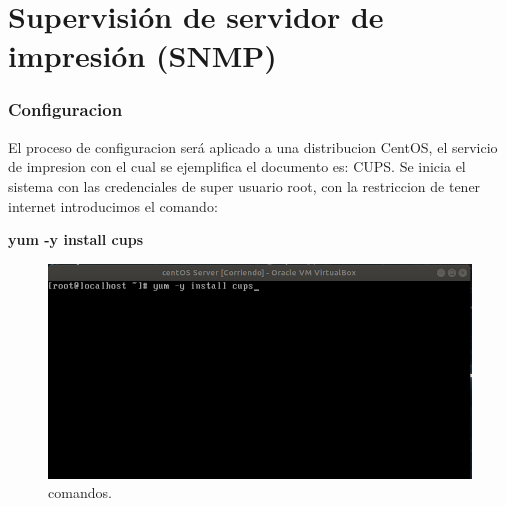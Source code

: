 \section{Supervisión de servidor de impresión (SNMP)}

\subsubsection{Configuracion}

El proceso de configuracion será aplicado a una distribucion CentOS, el servicio de impresion con el cual se ejemplifica el documento es: CUPS.
Se inicia el sistema con las credenciales de super usuario root, con la restriccion de tener internet introducimos el comando:
\\
\begin{center}
\textbf{yum -y install cups}
\end {center}
						
\FloatBarrier
\begin{figure}[htbp!]
		\centering
			\includegraphics[width=.8 \textwidth]{images/r1}
		\caption{comandos.}
		\label{image:r1}
\end{figure}
\FloatBarrier

